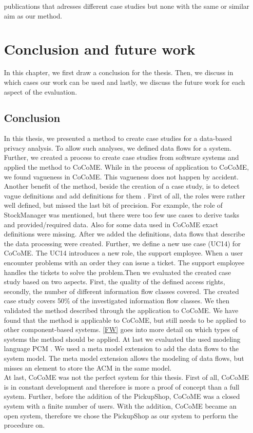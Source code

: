 publications that adresses different case studies but none with the same or similar aim as our method.
\chapter{Conclusion and future work}
\label{ch:Conclusion}
In this chapter, we first draw a conclusion for the thesis. Then, we discuss in which cases our work can be used and lastly, we discuss the future work for each aspect of the evaluation.
\section{Conclusion}
In this thesis, we presented a method to create case studies for a data-based privacy analysis. To allow such analyses, we defined data flows for a system. Further, we created a process to create case studies from software systems and applied the method to CoCoME. While in the process of application to CoCoME, we found vagueness in CoCoME. This vagueness does not happen by accident. Another benefit of the method, beside the creation of a case study, is to detect vague definitions and add definitions for them . First of all, the roles were rather well defined, but missed the last bit of precision. For example, the role of StockManager was mentioned, but there were too few use cases to derive tasks and provided/required data. Also for some data used in CoCoME exact definitions were missing. After we added the definitions, data flows that describe the data processing were created. Further, we define a new use case (UC14) for CoCoME. The UC14 introduces a new role, the support employee. When a user encounter problems with an order they can issue a ticket. The support employee handles the tickets to solve the problem.Then we evaluated the created case study based on two aspects. First, the quality of the defined access rights, secondly, the number of different information flow classes covered. The created case study  covers 50\% of the investigated information flow classes. We then validated the method described through the application to CoCoME. We have found that the method is applicable to CoCoME, but still needs to be applied to other component-based systems.  \autoref{FW} goes into more detail on which types of systems the method should be applied.  At last we evaluated the used modeling language PCM \cite{PCM}. We used a meta model extension to add the data flows to the system model. The meta model extension allows the modeling of data flows, but misses an element to store the ACM in the same model.\\
At last, CoCoME was not the perfect system for this thesis. First of all, CoCoME is in constant development and therefore is more a proof of concept than a full system. Further, before the addition of the PickupShop, CoCoME was a closed system with a finite number of users. With the addition, CoCoME became an open system, therefore we chose the PickupShop as our system to perform the procedure on.
